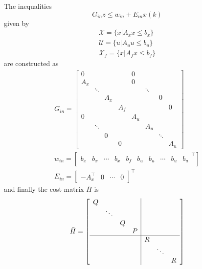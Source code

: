 The inequalities
\begin{equation*}
    G_{in} z \leq w_{in} + E_{in} x(k)
\end{equation*}
given by
\begin{gather*}
    \mathcal{X} = \{x|A_x x \leq b_x\} \\
    \mathcal{U} = \{u|A_u u \leq b_u\} \\
    \mathcal{X}_f = \{x|A_f x \leq b_f\}
\end{gather*}
are constructed as
\begin{gather*}
    G_{in} = \left[
        \begin{array}{cccc|cccc} %
            0   &        &     &     & 0   &        &        &     \\
            \hline %
            A_x &        &     &     & 0   &        &        &     \\
                & \ddots &     &     &     & \ddots &        &     \\
                &        & A_x &     &     &        & 0      &     \\
                &        &     & A_f &     &        &        & 0   \\
            \hline %
            0   &        &     &     & A_u &        &        &     \\
                & \ddots &     &     &     & A_u    &        &     \\
                &        & 0   &     &     &        & \ddots &     \\
                &        &     & 0   &     &        &        & A_u
        \end{array}
        \right]\\
    w_{in} = \left[
        \begin{array}{ccccc|ccccc} %
            b_x & b_x & \cdots & b_x & b_f & b_u & b_u & \cdots & b_u & b_u
        \end{array}^\top
        \right]\\
    E_{in} =\begin{bmatrix}
        -A_x^\top & 0 & \cdots & 0
    \end{bmatrix}^\top
\end{gather*}
and finally the cost matrix $\bar{H}$ is
\begin{equation*}
    \bar{H} = \left[
        \begin{array}{cccc|cccc} %
            Q &        &   &   &   &        &   \\
              & \ddots &   &   &   &        &   \\
              &        & Q &   &   &        &   \\
              &        &   & P &   &        &   \\
            \hline %
              &        &   &   & R &        &   \\
              &        &   &   &   & \ddots &   \\
              &        &   &   &   &        & R
        \end{array}
        \right]
\end{equation*}

